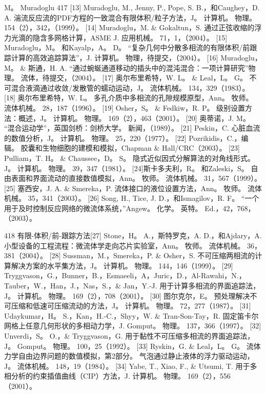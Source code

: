 \documentclass[UTF8,11pt,a4paper,openany,fontset=fandol]{ctexbook}
\begin{document}
M。 Muradoglu 417 [13] Muradoglu, M., Jenny, P., Pope, S. B.，和Caughey，D. A. 湍流反应流的PDF方程的一致混合有限体积/粒子方法，J。 计算机。 物理。 154（2），342，（1999）。 [14] Muradoglu，M. \& Gokaltun，S. 通过正弦收缩的浮力光滴的隐含多网格计算，ASME J. 应用机械。 71，1，（2004）。 [15] Muradoglu，M。 和Kayalp，A。 D。 “复杂几何中分散多相流的有限体积/前跟踪计算的高效追踪算法”，J. 计算机。 物理，待提交，（2004）。 [16] Muradoglu，M。 \& 斯通，H. A. “通过蜿蜒通道移动的插头中的混沌混合：一项计算研究”物理。 流体，待提交，（2004）。 [17] 奥尔布里希特，W. L。 \& Leal，L。 G。 不可混合液滴通过收敛/发散管的蠕动运动，J。 流体机械。 134，329（1983）。 [18] 奥尔布里希特，W. L。 多孔介质中多相流的孔隙规模原型，Ann。 牧师。 流体机械。 28，187（1996）。 [19] Osher，S。 \& Fedkiw，R. P。 级别设置方法：概述，J。 计算机。 物理。 169（2），463（2001）。 [20] 奥蒂诺，J. M。 “混合运动学”，英国剑桥：剑桥大学。 新闻，（1989）。 [21] Peskin，C. 心脏血流的数值分析，J。 计算机。 物理。 25，220（1977）。 [22] Pozrikidis，C.，编辑。 胶囊和生物细胞的建模和模拟，Chapman \& Hall/CRC（2003）。 [23] Pulliam，T. H。 \& Chaussee，D。 S。 隐式近似因式分解算法的对角线形式。 J。 计算机。 物理。 39，347（1981）。 [24]斯卡多夫利，R。 和Zaleski，S。 自由表面和界面流动的直接数值模拟，Ann。 牧师。 流体机械。 31，567（1999）。 [25] 塞西安，J. A. \& Smereka，P. 流体接口的液位设置方法，Ann。 牧师。 流体机械。 35，341（2003）。 [26] Song, H., Tice, J. D.，和Ismagilov，R. F。 “一个用于及时控制反应网络的微流体系统，”Angew。 化学。 英特。 Ed.，42，768，（2003）。

418 有限-体积/前-跟踪方法[27] Stone，H。 A.，斯特罗克，A. D.，和Ajdary，A. 小型设备的工程流程：微流体学走向芯片实验室，Ann。 牧师。 流体机械。 36，381（2004）。 [28] Sussman，M.，Smereka，P. \& Osher，S. 不可压缩两相流的计算解决方案的水平集方法，J。 计算机。 物理。 144，146（1999）。 [29] Tryggvason，G.，Bunner，B.，Esmaeeli，A，Juric，D.，Al-Rawahi，N.，Tauber，W.，Han，J.，Nas，S.，\& Jan，Y.-J. 用于计算多相流的界面追踪法，J。 计算机。 物理。 169（2），708（2001）。 [30] 图尔克尔，E。 预处理解决不可压缩和低速可压缩流动的方法，J。 计算机。 物理。 72，277（1987）。 [31] Udaykumar，H。 S.，Kan，H.-C.，Shyy，W. \& Tran-Son-Tay，R. 固定笛卡尔网格上任意几何形状的多相动力学，J. Gomput。 物理。 137，366（1997）。 [32] Unverdi，S。 O.，\& Tryggvason，G. 用于黏性不可压缩多相流的界面追踪法，J。 Gomput。 物理。 100，25（1992）。 [33] Ryskin，G. \& Leal，L。 G。 流体力学自由边界问题的数值模拟，第2部分。 气泡通过静止液体的浮力驱动运动，J。 流体机械。 148，19（1984）。 [34] Yabe, T., Xiao, F., \& Utsumi, T. 用于多相分析的约束插值曲线（CIP）方法，J. 计算机。 物理。 169（2），556（2001）。
\end{document}
